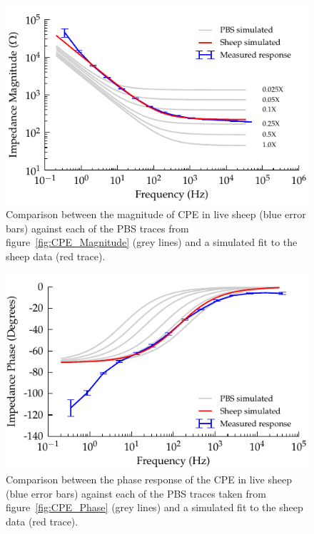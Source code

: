 \documentclass[journal, a4paper]{IEEEtran}
\begin{document}
\begin{figure}
    \begin{center}
        \includegraphics{graphics/displacement-withSheep_impedanceVsFrequency_magnitude}
    \end{center}
    \caption{Comparison between the magnitude of CPE in live sheep {\color{blue}(blue error bars)} against each of the PBS traces from figure~\ref{fig:CPE_Magnitude} (grey lines) and a simulated fit to the sheep data (red trace).}
    \label{fig:displacement_sheepCPEMagnitude}
\end{figure}

\begin{figure}
    \begin{center}
        \includegraphics{graphics/displacement-withSheep_impedanceVsFrequency_phase}
    \end{center}
    \caption{Comparison between the phase response of the CPE in live sheep {\color{blue}(blue error bars)} against each of the PBS traces taken from figure~\ref{fig:CPE_Phase} (grey lines) and a simulated fit to the sheep data (red trace).}
    \label{fig:displacement_sheepCPEPhase}
\end{figure}
\end{document}
